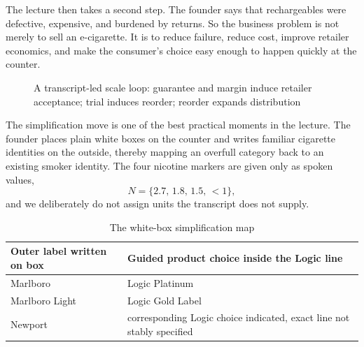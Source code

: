The lecture then takes a second step. The founder says that rechargeables were defective, expensive, and burdened by returns. So the business problem is not merely to sell an e-cigarette. It is to reduce failure, reduce cost, improve retailer economics, and make the consumer's choice easy enough to happen quickly at the counter.

\begin{figure}[h]
\centering
{}
\caption{A transcript-led scale loop: guarantee and margin induce retailer acceptance; trial induces reorder; reorder expands distribution}
\end{figure}

The simplification move is one of the best practical moments in the lecture. The founder places plain white boxes on the counter and writes familiar cigarette identities on the outside, thereby mapping an overfull category back to an existing smoker identity. The four nicotine markers are given only as spoken values,
\[
N=\{2.7,\,1.8,\,1.5,\,<1\},
\]
and we deliberately do not assign units the transcript does not supply.

\begin{table}[h]
\centering
\caption{The white-box simplification map}
\begin{tabular}{|l|l|}
\hline
Outer label written on box & Guided product choice inside the Logic line \\
\hline
Marlboro & Logic Platinum \\
Marlboro Light & Logic Gold Label \\
Newport & corresponding Logic choice indicated, exact line not stably specified \\
\hline
\end{tabular}
\end{table}


